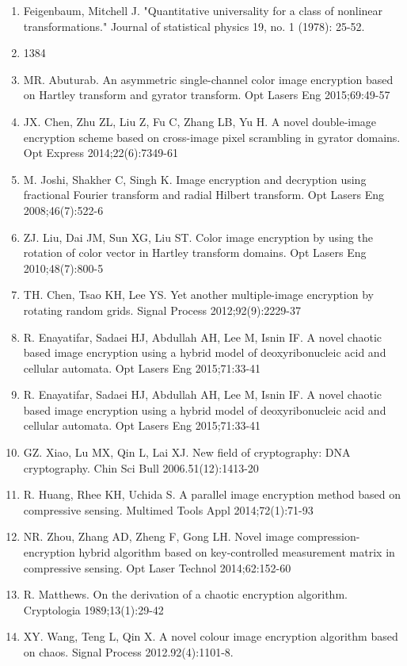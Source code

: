 \begin{enumerate}
\item
  Feigenbaum, Mitchell J. "Quantitative universality for a class of nonlinear transformations." Journal of statistical physics 19, no. 1 (1978): 25-52.
\item
   1384
\item
  MR. Abuturab. An asymmetric single-channel color image encryption based on Hartley transform and gyrator transform. Opt Lasers Eng 2015;69:49-57
\item
  JX. Chen, Zhu ZL, Liu Z, Fu C, Zhang LB, Yu H. A novel double-image encryption scheme based on cross-image pixel scrambling in gyrator domains. Opt Express 2014;22(6):7349-61
\item
  M. Joshi, Shakher C, Singh K. Image encryption and decryption using fractional Fourier transform and radial Hilbert transform. Opt Lasers Eng 2008;46(7):522-6
\item
  ZJ. Liu, Dai JM, Sun XG, Liu ST. Color image encryption by using the rotation of color vector in Hartley transform domains. Opt Lasers Eng 2010;48(7):800-5
\item
  TH. Chen, Tsao KH, Lee YS. Yet another multiple-image encryption by rotating random grids. Signal Process 2012;92(9):2229-37
\item
  R. Enayatifar, Sadaei HJ, Abdullah AH, Lee M, Isnin IF. A novel chaotic based image encryption using a hybrid model of deoxyribonucleic acid and cellular automata. Opt Lasers Eng 2015;71:33-41
\item
  R. Enayatifar, Sadaei HJ, Abdullah AH, Lee M, Isnin IF. A novel chaotic based image encryption using a hybrid model of deoxyribonucleic acid and cellular automata. Opt Lasers Eng 2015;71:33-41
\item
  GZ. Xiao, Lu MX, Qin L, Lai XJ. New field of cryptography: DNA cryptography. Chin Sci Bull 2006.51(12):1413-20
\item
  R. Huang, Rhee KH, Uchida S. A parallel image encryption method based on compressive sensing. Multimed Tools Appl 2014;72(1):71-93
\item
  NR. Zhou, Zhang AD, Zheng F, Gong LH. Novel image compression-encryption hybrid algorithm based on key-controlled measurement matrix in compressive sensing. Opt Laser Technol 2014;62:152-60
\item
  R. Matthews. On the derivation of a chaotic encryption algorithm. Cryptologia 1989;13(1):29-42
\item
  XY. Wang, Teng L, Qin X. A novel colour image encryption algorithm based on chaos. Signal Process 2012.92(4):1101-8.

\end{enumerate}
